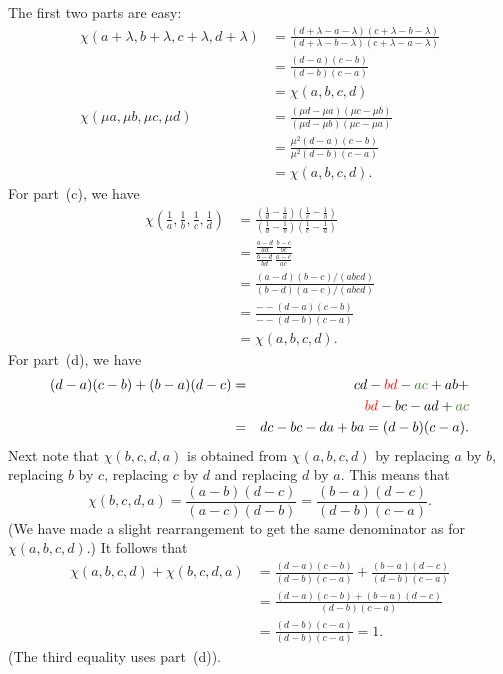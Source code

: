 \documentclass[a4paper]{book}
\newcommand{\RED}[1]{{\color{red}#1}}
\newcommand{\OLIVEGREEN}[1]{{\color{olivegreen}#1}}
\newcommand{\lm}        {\lambda}
\renewcommand{\:}{\colon}
\theoremstyle{definition}
\renewenvironment{solution}{\SolutionInline}{\endSolutionInline}
\begin{document}
\begin{solution}
 The first two parts are easy:
 \begin{align*}
  \chi(a+\lm,b+\lm,c+\lm,d+\lm) 
   &= \frac{(d+\lm-a-\lm)(c+\lm-b-\lm)}
           {(d+\lm-b-\lm)(c+\lm-a-\lm)} \\
   &= \frac{(d-a)(c-b)}{(d-b)(c-a)} \\
   &= \chi(a,b,c,d) \\
  \chi(\mu a,\mu b,\mu c,\mu d)
   &= \frac{(\mu d-\mu a)(\mu c-\mu b)}
           {(\mu d-\mu b)(\mu c-\mu a)} \\
   &= \frac{\mu^2(d-a)(c-b)}{\mu^2(d-b)(c-a)} \\
   &= \chi(a,b,c,d).
 \end{align*}
 For part~(c), we have
 \begin{align*}
  \chi(\frac{1}{a},\frac{1}{b},\frac{1}{c},\frac{1}{d})
   &= \frac{\left(\frac{1}{d}-\frac{1}{a}\right)
            \left(\frac{1}{c}-\frac{1}{b}\right)}
           {\left(\frac{1}{d}-\frac{1}{b}\right)
            \left(\frac{1}{c}-\frac{1}{a}\right)} \\
   &= \frac{\frac{a-d}{ad}\,\frac{b-c}{bc}}
           {\frac{b-d}{bd}\,\frac{a-c}{ac}} \\
   &= \frac{(a-d)(b-c)/(abcd)}{(b-d)(a-c)/(abcd)} \\
   &= \frac{--(d-a)(c-b)}{--(d-b)(c-a)} \\
   &= \chi(a,b,c,d).
 \end{align*}
 For part~(d), we have
 \begin{eqnarray*}
  (d-a)(c-b)+(b-a)(d-c)
   &=& cd - \RED{bd} - \OLIVEGREEN{ac} + ab + \\
   &&  \RED{bd} - bc - ad + \OLIVEGREEN{ac} \\
   &=& dc - bc - da + ba = (d-b)(c-a).  
 \end{eqnarray*}
 Next note that $\chi(b,c,d,a)$ is obtained from $\chi(a,b,c,d)$ by
 replacing $a$ by $b$, replacing $b$ by $c$, replacing $c$ by $d$ and
 replacing $d$ by $a$.  This means that
 \[ \chi(b,c,d,a) = \frac{(a-b)(d-c)}{(a-c)(d-b)}
                  = \frac{(b-a)(d-c)}{(d-b)(c-a)}.
 \]
 (We have made a slight rearrangement to get the same denominator as
 for $\chi(a,b,c,d)$.)
 It follows that 
 \begin{align*}
  \chi(a,b,c,d) + \chi(b,c,d,a) &= 
   \frac{(d-a)(c-b)}{(d-b)(c-a)} + \frac{(b-a)(d-c)}{(d-b)(c-a)} \\
   &= \frac{(d-a)(c-b)+(b-a)(d-c)}{(d-b)(c-a)} \\
   &= \frac{(d-b)(c-a)}{(d-b)(c-a)} = 1.
 \end{align*}
 (The third equality uses part~(d)).
\end{solution}
\end{document}
